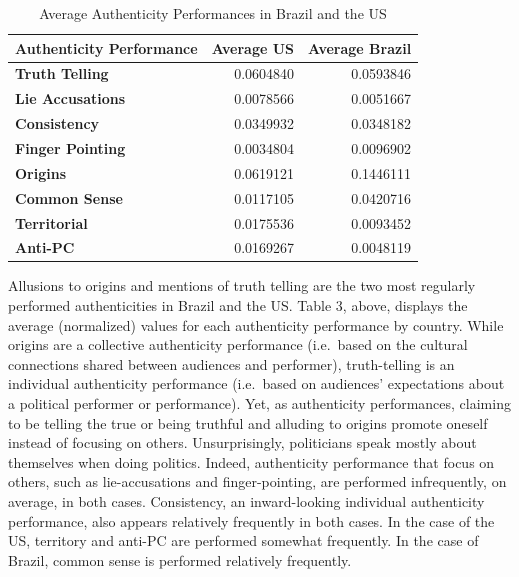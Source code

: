 \documentclass[smallextended]{svjour3}       %
\begin{document}
\begin{table}[H]

\caption{\label{tab:table 3}Average Authenticity Performances in Brazil and the US}
\centering
\begin{tabular}[t]{>{}lrr}
\toprule
Authenticity Performance & Average US & Average Brazil\\
\midrule
\textbf{Truth Telling} & 0.0604840 & 0.0593846\\
\textbf{Lie Accusations} & 0.0078566 & 0.0051667\\
\textbf{Consistency} & 0.0349932 & 0.0348182\\
\textbf{Finger Pointing} & 0.0034804 & 0.0096902\\
\textbf{Origins} & 0.0619121 & 0.1446111\\
\addlinespace
\textbf{Common Sense} & 0.0117105 & 0.0420716\\
\textbf{Territorial} & 0.0175536 & 0.0093452\\
\textbf{Anti-PC} & 0.0169267 & 0.0048119\\
\bottomrule
\end{tabular}
\end{table}

Allusions to origins and mentions of truth telling are the two most
regularly performed authenticities in Brazil and the US. Table 3, above,
displays the average (normalized) values for each authenticity
performance by country. While origins are a collective authenticity
performance (i.e.~based on the cultural connections shared between
audiences and performer), truth-telling is an individual authenticity
performance (i.e.~based on audiences' expectations about a political
performer or performance). Yet, as authenticity performances, claiming
to be telling the true or being truthful and alluding to origins promote
oneself instead of focusing on others. Unsurprisingly, politicians speak
mostly about themselves when doing politics. Indeed, authenticity
performance that focus on others, such as lie-accusations and
finger-pointing, are performed infrequently, on average, in both cases.
Consistency, an inward-looking individual authenticity performance, also
appears relatively frequently in both cases. In the case of the US,
territory and anti-PC are performed somewhat frequently. In the case of
Brazil, common sense is performed relatively frequently.
\end{document}

